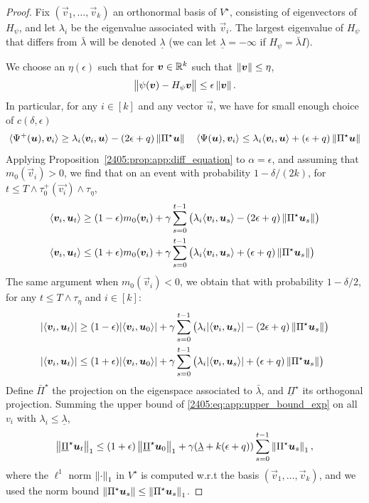 \begin{proof}
  Fix $(\vec{v}_1, \dots, \vec{v}_k)$ an orthonormal basis of $V^\star$, consisting of eigenvectors of $H_\psi$, and let $\lambda_i$ be the eigenvalue associated with $\vec{v}_i$. The largest eigenvalue of $H_\psi$ that differs from $\bar\lambda$ will be denoted $\underline\lambda$ (we can let $\underline\lambda = -\infty$ if $H_\psi = \bar\lambda I$).
  
  We choose an $\eta(\epsilon)$ such that for ${\boldsymbol{v}}\in \mathbb{R}^k$ such that $\left\lVert {\boldsymbol{v}}\right\rVert \leq \eta$,
  \[ \left\lVert \psi({\boldsymbol{v}}) - H_\psi {\boldsymbol{v}}\right\rVert \leq \epsilon \left\lVert {\boldsymbol{v}}\right\rVert. \]
  In particular, for any $i \in [k]$ and any vector $\vec{u}$, we have for small enough choice of $c(\delta, \epsilon)$
  \[ \langle \Psi^+({\boldsymbol{u}}), {\boldsymbol{v}}_i \rangle \geq \lambda_i \langle {\boldsymbol{v}}_i, {\boldsymbol{u}} \rangle - (2\epsilon + q)\left\lVert \Pi^\star{\boldsymbol{u}}\right\rVert \quad \langle \Psi({\boldsymbol{u}}), {\boldsymbol{v}}_i \rangle \leq \lambda_i \langle {\boldsymbol{v}}_i, {\boldsymbol{u}} \rangle + (\epsilon + q)\left\lVert \Pi^\star{\boldsymbol{u}}\right\rVert \]
  Applying Proposition~\ref{2405:prop:app:diff_equation} to $\alpha = \epsilon$, and assuming that $m_0(\vec{v}_i) > 0$, we find that on an event with probability $1 - \delta/(2k)$, for $t \leq T \wedge \tau_0^+(\vec{v_i}) \wedge \tau_\eta$,
  \begin{align*}
     \langle {\boldsymbol{v}}_i, {\boldsymbol{u}}_t \rangle &\geq (1 - \epsilon)m_0({\boldsymbol{v}}_i) + \gamma \sum_{s=0}^{t-1} \left(\lambda_i\langle {\boldsymbol{v}}_i, {\boldsymbol{u}}_s \rangle  - (2\epsilon + q)\left\lVert \Pi^\star{\boldsymbol{u}}_s\right\rVert\right) \\ 
     \langle {\boldsymbol{v}}_i, {\boldsymbol{u}}_t \rangle &\leq (1 + \epsilon)m_0({\boldsymbol{v}}_i) + \gamma \sum_{s=0}^{t-1} \left(\lambda_i\langle {\boldsymbol{v}}_i, {\boldsymbol{u}}_s \rangle + (\epsilon + q)\left\lVert \Pi^\star{\boldsymbol{u}}_s\right\rVert\right)
  \end{align*}
  The same argument when $m_0(\vec{v}_i) < 0$, we obtain
  that with probability $1 - \delta/2$, for any $t \leq T \wedge \tau_\eta$ and $i \in [k]$:
  \begin{align}
    |\langle {\boldsymbol{v}}_i, {\boldsymbol{u}}_t \rangle| &\geq (1 - \epsilon)|\langle {\boldsymbol{v}}_i, {\boldsymbol{u}}_0 \rangle| + \gamma \sum_{s=0}^{t-1} \left(\lambda_i|\langle {\boldsymbol{v}}_i, {\boldsymbol{u}}_s \rangle|  - (2\epsilon + q)\left\lVert \Pi^\star{\boldsymbol{u}}_s\right\rVert\right) \label{2405:eq:app:lower_bound_exp}\\
    |\langle {\boldsymbol{v}}_i, {\boldsymbol{u}}_t \rangle| &\leq (1 + \epsilon)|\langle {\boldsymbol{v}}_i, {\boldsymbol{u}}_0 \rangle| + \gamma \sum_{s=0}^{t-1} \left(\lambda_i|\langle {\boldsymbol{v}}_i, {\boldsymbol{u}}_s \rangle| + (\epsilon + q)\left\lVert \Pi^\star{\boldsymbol{u}}_s\right\rVert\right)\label{2405:eq:app:upper_bound_exp}
  \end{align}
Define $\bar\Pi^\star$ the projection on the eigenspace associated to $\bar\lambda$, and $\underline\Pi^\star$ its orthogonal projection. Summing the upper bound of \eqref{2405:eq:app:upper_bound_exp} on all $v_i$ with $\lambda_i \leq \underline\lambda$,
\[ \left\lVert \underline\Pi^\star {\boldsymbol{u}}_t\right\rVert_1 \leq (1 + \epsilon)\left\lVert \underline\Pi^\star {\boldsymbol{u}}_0\right\rVert_1 + \gamma (\underline\lambda + k(\epsilon + q)) \sum_{s=0}^{t-1} \left\lVert \Pi^\star {\boldsymbol{u}}_s\right\rVert_1, \]
  where the $\ell^1$ norm $\left\lVert  \cdot \right\rVert_1$ in $V^\star$ is computed w.r.t the basis $(\vec{v}_1, \dots, \vec{v}_k)$, and we used the norm bound $\left\lVert \Pi^\star {\boldsymbol{u}}_s\right\rVert \leq \left\lVert \Pi^\star {\boldsymbol{u}}_s\right\rVert_1$.


\end{proof}
